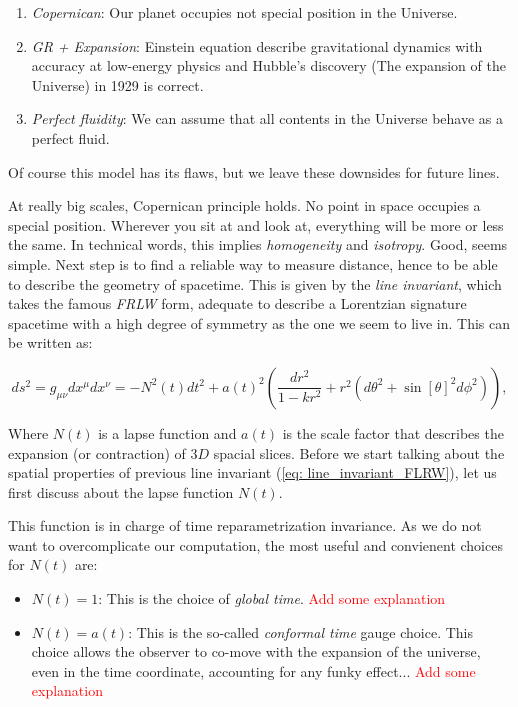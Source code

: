 \documentclass[11pt, a4paper]{article} %
\begin{document}
\begin{enumerate}
	\item \textit{Copernican}: Our planet occupies not special position in the Universe.
	\item \textit{GR + Expansion}: Einstein equation describe gravitational dynamics with accuracy at low-energy physics and Hubble's discovery (The expansion of the Universe) in 1929 is correct.
	\item \textit{Perfect fluidity}: We can assume that all contents in the Universe behave as a perfect fluid.
\end{enumerate}

Of course this model has its flaws, but we leave these downsides for future lines.

At really big scales, Copernican principle holds. No point in space occupies a special position. Wherever you sit at and look at, everything will be more or less the same. In technical words, this implies \textit{homogeneity} and \textit{isotropy}. Good, seems simple. Next step is to find a reliable way to measure distance, hence to be able to describe the geometry of spacetime. This is given by the \textit{line invariant}, which takes the famous \textit{FRLW} form, adequate to describe a Lorentzian signature spacetime with a high degree of symmetry as the one we seem to live in. This can be written as:

\begin{equation}\label{eq: line_invariant_FLRW}
	ds^{2} = g_{\mu \nu} dx^{\mu} dx^{\nu} = - N^{2}(t) dt^{2} + a(t)^2 \left(\frac{dr^{2}}{1- k r^{2}}+ r^{2} \left(d\theta^{2} + \sin[\theta]^{2} d\phi^{2}\right)\right),
\end{equation}

Where $N(t)$ is a lapse function and $a(t)$ is the scale factor that describes the expansion (or contraction) of $3D$ spacial slices. Before we start talking about the spatial properties of previous line invariant (\ref{eq: line_invariant_FLRW}), let us first discuss about the lapse function $N(t)$. 

This function is in charge of time reparametrization invariance. As we do not want to overcomplicate our computation, the most useful and convienent choices for $N(t)$ are:

\begin{itemize}
	\item $N(t) = 1$: This is the choice of \textit{global time}. \textcolor{red}{Add some explanation}
	\item $N(t) = a(t)$: This is the so-called \textit{conformal time} gauge choice. This choice allows the observer to co-move with the expansion of the universe, even in the time coordinate, accounting for any funky effect... \textcolor{red}{Add some explanation}
\end{itemize}
\end{document}
